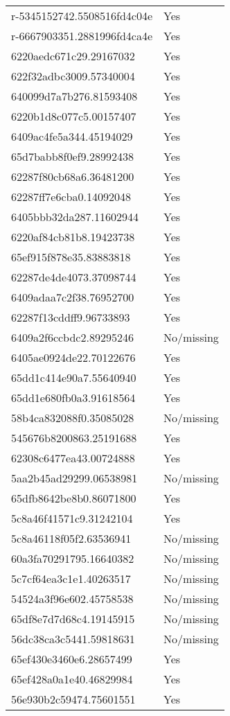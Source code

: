 \begin{tabular}{ll}
r-5345152742.5508516fd4c04e & Yes \\
r-6667903351.2881996fd4ca4e & Yes \\
6220aedc671c29.29167032 & Yes \\
622f32adbc3009.57340004 & Yes \\
640099d7a7b276.81593408 & Yes \\
6220b1d8c077c5.00157407 & Yes \\
6409ac4fe5a344.45194029 & Yes \\
65d7babb8f0ef9.28992438 & Yes \\
62287f80cb68a6.36481200 & Yes \\
62287ff7e6cba0.14092048 & Yes \\
6405bbb32da287.11602944 & Yes \\
6220af84cb81b8.19423738 & Yes \\
65ef915f878e35.83883818 & Yes \\
62287de4de4073.37098744 & Yes \\
6409adaa7c2f38.76952700 & Yes \\
62287f13cddff9.96733893 & Yes \\
6409a2f6ccbdc2.89295246 & No/missing \\
6405ae0924de22.70122676 & Yes \\
65dd1c414e90a7.55640940 & Yes \\
65dd1e680fb0a3.91618564 & Yes \\
58b4ca832088f0.35085028 & No/missing \\
545676b8200863.25191688 & Yes \\
62308c6477ea43.00724888 & Yes \\
5aa2b45ad29299.06538981 & No/missing \\
65dfb8642be8b0.86071800 & Yes \\
5c8a46f41571c9.31242104 & Yes \\
5c8a46118f05f2.63536941 & No/missing \\
60a3fa70291795.16640382 & No/missing \\
5c7cf64ea3c1e1.40263517 & No/missing \\
54524a3f96e602.45758538 & No/missing \\
65df8e7d7d68c4.19145915 & No/missing \\
56dc38ca3c5441.59818631 & No/missing \\
65ef430e3460e6.28657499 & Yes \\
65ef428a0a1e40.46829984 & Yes \\
56e930b2c59474.75601551 & Yes \\

\end{tabular}
